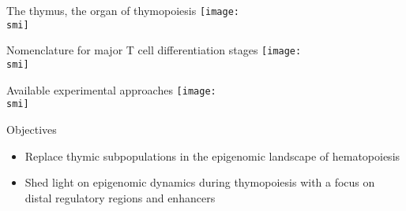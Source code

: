 \documentclass[10pt]{beamer}
\def\smi{out/ln/updir/mw-gcthesis-oral/library.bib}
\begin{document}
\begin{frame}{The thymus, the organ of thymopoiesis}
  \def\smi{out/ln/updir/mw-gcthesis-oral/ink/thymus/4.pdf}
  \texttt{[image: \\smi]}
\end{frame}
\begin{frame}{Nomenclature for major T cell differentiation stages}
  \def\smi{out/ln/updir/mw-gcthesis-oral/ink/thymus/5.pdf}
  \texttt{[image: \\smi]}
\end{frame}
\begin{frame}{Available experimental approaches}
  \def\smi{out/ln/updir/mw-gcthesis-oral/ink/thymus/6.pdf}
  \texttt{[image: \\smi]}
\end{frame}
\begin{frame}{Objectives}
  \begin{itemize}
    \item Replace thymic subpopulations in the epigenomic landscape of hematopoiesis
    \item Shed light on epigenomic dynamics during thymopoiesis with a focus on distal regulatory regions and enhancers
  \end{itemize}
\end{frame}
\end{document}
